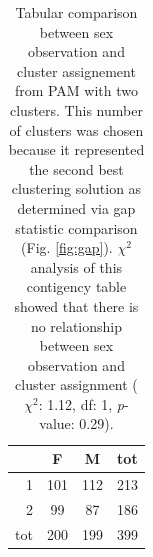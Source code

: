 \documentclass[12pt,letterpaper]{article}\usepackage{graphicx, color}
\begin{document}
\begin{table}
  \centering
\begin{tabular}{r|cc|c}
  & F & M & tot \\ 
  \hline
1 & 101 & 112 & 213 \\ 
  2 & 99 & 87 & 186 \\ 
   \hline
tot & 200 & 199 & 399 \\ 
  \end{tabular}


  \caption{Tabular comparison between sex observation and cluster assignement from PAM with two clusters. This number of clusters was chosen because it represented the second best clustering solution as determined via gap statistic comparison (Fig. \ref{fig:gap}). \(\chi^{2}\) analysis of this contigency table showed that there is no relationship between sex observation and cluster assignment (\(\chi^{2}\): 1.12, df: 1, \textit{p}-value: 0.29).}
  \label{tab:chi}
\end{table}
\end{document}
